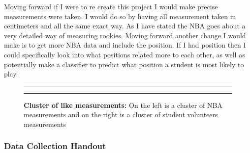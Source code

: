\documentclass[]{article}
\begin{document}
\noindent Moving forward if I were to re create this project I would
make precise measurements were taken. I would do so by having all
measurement taken in centimeters and all the same exact way. As I have
stated the NBA goes about a very detailed way of measuring rookies.
Moving forward another change I would make is to get more NBA data and
include the position. If I had position then I could specifically look
into what positions related more to each other, as well as potentially
make a classifier to predict what position a student is most likely to
play.

\begin{figure}[!ht]
    \hrule
    \begin{center}
    \end{center}
    \label{fig:handout-3}
    \caption{ \textbf{Cluster of like measurements:} On the left is a cluster of NBA measurements and on the right is a cluster of student volunteers measurements}
    \hrule
\end{figure}

\newpage

\subsubsection{Data Collection Handout}
\label{sec:appendix-data-handout}
\end{document}
